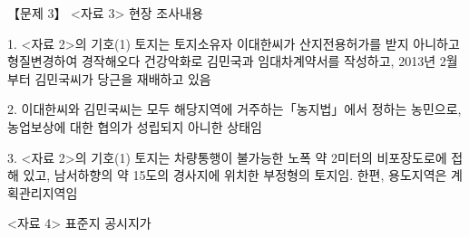 \begin{longquestion}{【문제 3】}
<자료 3> 현장 조사내용 \par
1. <자료 2>의 기호(1) 토지는 토지소유자 이대한씨가 산지전용허가를 받지 아니하고 형질변경하여 경작해오다 건강악화로 김민국과 임대차계약서를 작성하고, 2013년 2월부터 김민국씨가 당근을 재배하고 있음 \par
2. 이대한씨와 김민국씨는 모두 해당지역에 거주하는「농지법」에서 정하는 농민으로, 농업보상에 대한 협의가 성립되지 아니한 상태임 \par
3. <자료 2>의 기호(1) 토지는 차량통행이 불가능한 노폭 약 2미터의 비포장도로에 접해 있고, 남서하향의 약 15도의 경사지에 위치한 부정형의 토지임. 한편, 용도지역은 계획관리지역임 \par
<자료 4> 표준지 공시지가 \par
{\small\centering
{}\par}


\end{longquestion}
